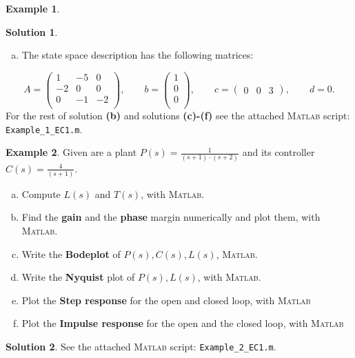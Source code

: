 \documentclass[a4paper,12 pt]{article}
\numberwithin{equation}{section}
\theoremstyle{definition}
\newtheorem{bsp}{Example}
\theoremstyle{remark}
\theoremstyle{definition}
\newtheorem*{lsg}{Solution}
\theoremstyle{definition}
\theoremstyle{definition}
\theoremstyle{remark}
\begin{document}
\begin{bsp}
\begin{lsg}
\begin{enumerate}[(b)]
\item The state space description has the following matrices:
\end{enumerate}
\begin{equation*}
A=\begin{pmatrix}
1&-5&0\\
-2&0&0\\
0&-1&-2\\
\end{pmatrix}, \qquad b=\begin{pmatrix}
1\\
0\\
0\\
\end{pmatrix}, \qquad c=\begin{pmatrix}
0&0&3
\end{pmatrix},\qquad d=0.
\end{equation*}
For the rest of solution \textbf{(b)} and solutions \textbf{(c)-(f)} see the attached \textsc{Matlab} script: \verb+Example_1_EC1.m+.
\end{lsg}
\end{bsp}
\newpage
\begin{bsp}
Given are a plant $P(s)=\frac{1}{(s+1)\cdot (s+2)}$ and its controller $C(s)=\frac{4}{(s+1)}$.
\begin{enumerate}[(a)]
\item Compute $L(s)$ and $T(s)$, with \textsc{Matlab}.
\item Find the \textbf{gain} and the \textbf{phase} margin numerically and plot them, with \textsc{Matlab}.
\item Write the \textbf{Bodeplot} of $P(s),C(s),L(s)$, \textsc{Matlab}.
\item Write the \textbf{Nyquist} plot of $P(s),L(s)$, with \textsc{Matlab}.
\item Plot the \textbf{Step response} for the open and closed loop, with \textsc{Matlab}
\item Plot the \textbf{Impulse response} for the open and the closed loop, with \textsc{Matlab}

\end{enumerate}

\begin{lsg}
See the attached \textsc{Matlab} script: \verb+Example_2_EC1.m+.

\end{lsg}


\end{bsp}
\newpage
\end{document}
